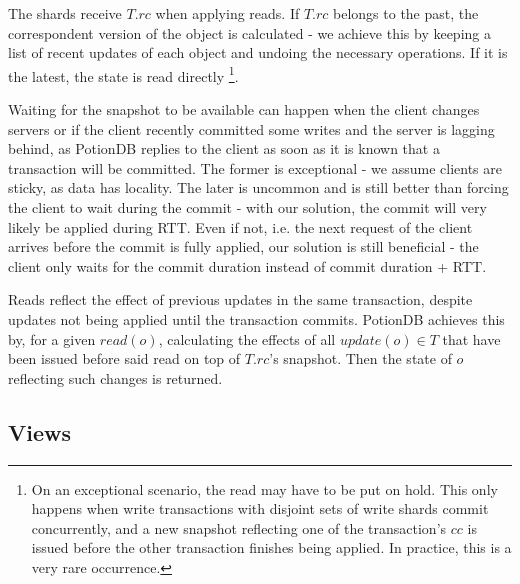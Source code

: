\documentclass{vldb}
\begin{document}
The shards receive $T.rc$ when applying reads.
If $T.rc$ belongs to the past, the correspondent version of the object is calculated - we achieve this by keeping a list of recent updates of each object and undoing the necessary operations. %
If it is the latest, the state is read directly \footnote{On an exceptional scenario, the read may have to be put on hold. This only happens when write transactions with disjoint sets of write shards commit concurrently, and a new snapshot reflecting one of the transaction's $cc$ is issued before the other transaction finishes being applied. In practice, this is a very rare occurrence.}.

Waiting for the snapshot to be available can happen when the client changes servers or if the client recently committed some writes and the server is lagging behind, as PotionDB replies to the client as soon as it is known that a transaction will be committed.
The former is exceptional - we assume clients are sticky, as data has locality.
The later is uncommon and is still better than forcing the client to wait during the commit - with our solution, the commit will very likely be applied during RTT.
Even if not, i.e. the next request of the client arrives before the commit is fully applied, our solution is still beneficial -  the client only waits for the commit duration instead of commit duration + RTT.

Reads reflect the effect of previous updates in the same transaction, despite updates not being applied until the transaction commits.
PotionDB achieves this by, for a given $read(o)$, calculating the effects of all $update(o) \in T$ that have been issued before said read on top of $T.rc$'s snapshot.
Then the state of $o$ reflecting such changes is returned.

\subsection{Views}
\label{subsec:viewsTransaction}
\end{document}
